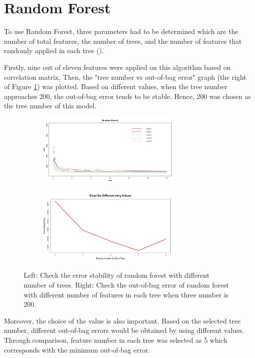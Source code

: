 \section{Random Forest} %

To use Random Forest, three parameters had to be determined which are the number of total features, the number of trees, and the number of features that randomly applied in each tree (). 

Firstly, nine out of eleven features were applied on this algorithm based on correlation matrix. Then, the "tree number vs out-of-bag error" graph (the right of Figure \ref{4.2.6-RF-200Trees-5Features}) was plotted. Based on different  values, when the tree number approaches 200, the out-of-bag error tends to be stable. Hence, 200 was chosen as the tree number of this model.


\begin{figure}[htbp]
\center
  \begin{subfigure}{7.5cm}
    \centering\includegraphics[width=7cm]{Figure/4.2.4-RF-200TreesStable.png}
  \end{subfigure}
  \begin{subfigure}{7.5cm}
    \centering\includegraphics[width=7cm]{Figure/4.2.4-RF-5Features.png}
  \end{subfigure}
  \caption{Left: Check the error stability of random forest with different number of trees. Right: Check the out-of-bag error of random forest with different number of features in each tree when three number is 200.}
  \label{4.2.6-RF-200Trees-5Features}
\end{figure}

Moreover, the choice of the  value is also important. Based on the selected tree number, different out-of-bag errors would be obtained by using different  values. Through comparison, feature number in each tree was selected as 5 which corresponds with the minimum out-of-bag error.

